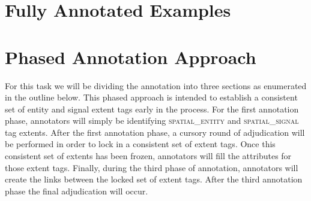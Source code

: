\documentclass[11pt]{article}
\begin{document}





\section{Fully Annotated Examples} %
\label{sec:fully_annotated_examples}





\section{Phased Annotation Approach} %
\label{sec:phased_annotation_approach}

For this task we will be dividing the annotation into three sections as enumerated in the outline below. This phased approach is intended to establish a consistent set of entity and signal extent tags early in the process. For the first annotation phase, annotators will simply be identifying \textsc{spatial\_entity} and \textsc{spatial\_signal} tag extents. After the first annotation phase, a cursory round of adjudication will be performed in order to lock in a consistent set of extent tags. Once this consistent set of extents has been frozen, annotators will fill the attributes for those extent tags. Finally, during the third phase of annotation, annotators will create the links between the locked set of extent tags. After the third annotation phase the final adjudication will occur.
\end{document}
